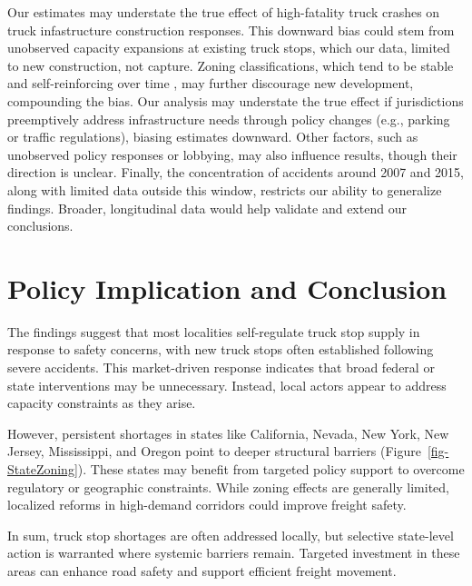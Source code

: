 \documentclass[
  12pt]{article}
\begin{document}
Our estimates may understate the true effect of high-fatality truck
crashes on truck infastructure construction responses. This downward
bias could stem from unobserved capacity expansions at existing truck
stops, which our data, limited to new construction, not capture. Zoning
classifications, which tend to be stable and self-reinforcing over time
\citep{mclaughlinLandUseRegulation2012}, may further discourage new
development, compounding the bias. Our analysis may understate the true
effect if jurisdictions preemptively address infrastructure needs
through policy changes (e.g., parking or traffic regulations), biasing
estimates downward. Other factors, such as unobserved policy responses
or lobbying, may also influence results, though their direction is
unclear. Finally, the concentration of accidents around 2007 and 2015,
along with limited data outside this window, restricts our ability to
generalize findings. Broader, longitudinal data would help validate and
extend our conclusions.

\section{Policy Implication and
Conclusion}\label{policy-implication-and-conclusion}

The findings suggest that most localities self-regulate truck stop
supply in response to safety concerns, with new truck stops often
established following severe accidents. This market-driven response
indicates that broad federal or state interventions may be unnecessary.
Instead, local actors appear to address capacity constraints as they
arise.

However, persistent shortages in states like California, Nevada, New
York, New Jersey, Mississippi, and Oregon point to deeper structural
barriers (Figure~\ref{fig-StateZoning}). These states may benefit from
targeted policy support to overcome regulatory or geographic
constraints. While zoning effects are generally limited, localized
reforms in high-demand corridors could improve freight safety.

In sum, truck stop shortages are often addressed locally, but selective
state-level action is warranted where systemic barriers remain. Targeted
investment in these areas can enhance road safety and support efficient
freight movement.
\end{document}
